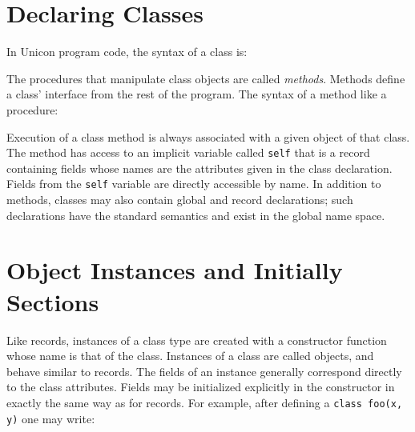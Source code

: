\section{Declaring Classes}

In Unicon program code, the syntax of a class
is: 


\noindent
The procedures that manipulate class objects are called
\textit{methods}. Methods define a
class' interface from the rest of the program. The
syntax of a method like a procedure: 


Execution of a class method is always associated with a given object of
that class. The method has access to an implicit
variable called
\texttt{self} that is a record containing fields whose
names are the attributes given in the class declaration. Fields from
the \texttt{self} variable are directly accessible by name. In addition
to methods, classes may also contain global and
record declarations; such declarations have the standard semantics and
exist in the global name space. 

\section{Object Instances and Initially Sections}

Like records, instances of a class type
are created with a constructor function whose
name is that of the class. Instances of a class are called objects, and
behave similar to records. The fields of an instance generally
correspond directly to the class attributes. Fields may be initialized
explicitly in the constructor in exactly the same way as for records.
For example, after defining a \texttt{class foo(x, y)} one may write: 


